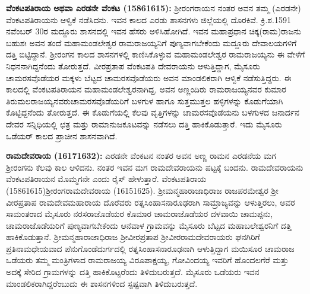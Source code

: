\textbf{ವೆಂಕಟಪತಿರಾಯ ಅಥವಾ ಎರಡನೇ ವೆಂಕಟ (1586\general{\enginline{-}}1615): } ಶ‍್ರೀರಂಗರಾಯನ ನಂತರ ಅವನ ತಮ್ಮ (ಎರಡನೇ) ವೆಂಕಟಪತಿರಾಯನು ಆಳ್ವಿಕೆ ನಡೆಸಿದನು. ಇವನ ಕಾಲದ ಎರಡು ಶಾಸನಗಳು ಜಿಲ್ಲೆಯಲ್ಲಿ ದೊರಕಿವೆ. ಕ್ರಿ.ಶ.1591 ನವೆಂಬರ್​ 30ರ ಮದ್ದೂರು ಶಾಸನದಲ್ಲಿ ಇವನ ಹೆಸರು ಅಳಿಸಿಹೋಗಿದೆ. ಇವನ ಮಹಾಪ್ರಧಾನ ಚಿಕ್ಕ(ರಾಮ)ರಾಜನು ಬಹುಶಃ ಅವನ ತಂದೆ ಮಹಾಮಂಡಲೇಶ್ವರ ರಾಮರಾಜಯ್ಯನಿಗೆ ಪುಣ್ಯವಾಗಬೇಕೆಂದು ಮದ್ದೂರು ದೇವಾಲಯಗಳಿಗೆ ದತ್ತಿ ಬಿಟ್ಟಿದ್ದಾನೆ. ಶ‍್ರೀರಂಗನ ಕಾಲದ ಶಾಸನಗಳಲ್ಲಿ ಕಾಣಿಸಿಕೊಳ್ಳುವ ಮಹಾಮಂಡಲೇಶ್ವರ ರಾಮರಾಜಯ್ಯನು ಈ ವೇಳೆಗೆ ನಿಧನನಾಗಿದ್ದನೆಂದು ತೋರುತ್ತದೆ. ವೀರಪ್ರತಾಪ ವೆಂಕಟಪತಿ ದೇವರಾಯನು ಆಳುತ್ತಿದ್ದಾಗ, ಮೈಸೂರು ಚಾಮರಸವೊಡೆಯರ ಮಕ್ಕಳು ಬೆಟ್ಟದ ಚಾಮರಸವೊಡೆಯರು ಅವನ ಮಾಂಡಲಿಕರಾಗಿ ಆಳ್ವಿಕೆ ನಡೆಸುತ್ತಿದ್ದರು. ಈ ಕಾಲದಲ್ಲಿ ವೆಂಕಟಪತಿರಾಯನ ಮಹಾಮಂಡಲೇಶ್ವರನಾಗಿದ್ದ, ಅವನ ಅಣ್ಣಂದಿರು ರಾಮರಾಜಯ್ಯನವರ ಕುಮಾರ ತಿರುಮಲರಾಜಯ್ಯನವರು\break ಚಾಮರಸವೊಡೆಯರಿಗೆ ಬಳಗುಳ ಹಾಗೂ ಸುತ್ತಮುತ್ತಲ ಹಳ್ಳಿಗಳನ್ನು ಕೊಡುಗೆಯಾಗಿ ಕೊಟ್ಟಿದ್ದನೆಂದು ತೋರುತ್ತದೆ. ಈ ಕೊಡುಗೆಯಲ್ಲಿ ಕೆಲವು ವೃತ್ತಿಗಳನ್ನು ಚಾಮರಸವೊಡೆಯನು ಬಳಗುಳದ ಜನಾರ್ದನ ದೇವರ ಸನ್ನಿಧಿಯಲ್ಲಿ ಛತ್ರ ಮತ್ತು ರಾಮಾನುಜಕೂಟವನ್ನು ನಡೆಸಲು ದತ್ತಿ ಹಾಕಿಕೊಡುತ್ತಾರೆ. ಇದು ಮೈಸೂರು ಒಡೆಯರ್ ಕಾಲದ ಪ್ರಾಚೀನ ಶಾಸನವಾಗಿದೆ.

\textbf{ರಾಮದೇವರಾಯ (1617\general{\enginline{-}}1632): } ಎರಡನೇ ವೆಂಕಟನ ನಂತರ ಅವನ ಅಣ್ಣ ರಾಮನ ಎರಡನೆಯ ಮಗ ಶ‍್ರೀರಂಗನು ಕೆಲವು ಕಾಲ ಆಳಿದನು. ನಂತರ ಇವನ ಮಗ ರಾಮದೇವರಾಯನು ಪಟ್ಟಕ್ಕೆ ಬಂದನು. ರಾಮದೇವರಾಯನು ವೆಂಕಟಪತಿರಾಯನ ಮೊಮ್ಮಗನೇ ಎಂದು ರೈಸ್​ ಹೇಳುತ್ತಾರೆ. ವೆಂಕಟಪತಿರಾಯ\enginline{-} (1586\enginline{-}1615)\enginline{-}ಶ‍್ರೀರಂಗ\enginline{-}ರಾಮದೇವರಾಯ (1615\enginline{-}1625). ಶ‍್ರೀಮನ್ಮಹಾರಾಜಾಧಿರಾಜ ರಾಜಪರಮೇಶ್ವರ ಶ‍್ರೀ ವೀರಪ್ರತಾಪ ರಾಮದೇವಮಹಾರಾಯ ದೊರೆವರು ರತ್ನಸಿಂಹಾಸನಾರೂಢರಾಗಿ ಸಾಮ್ರಾಜ್ಯವನ್ನು ಆಳುತ್ತಿರಲು, ಅವರ ಸಾಮಂತರಾದ ಮೈಸೂರು ನರಸರಾಜೊಡೆಯರ ಕೊಮಾರ ಚಾಮರಾಜೊಡೆಯರ ದಳವಾಯಿ ಚಾಮಪ್ಪನು, ಚಾಮರಾಜೊಡೆಯರಿಗೆ ಪುಣ್ಯವಾಗಬೇಕೆಂದು ಆನೆವಾಳ ಗ್ರಾಮ\-ವನ್ನು ಮೈಸೂರು ಬೆಟ್ಟದ ಮಹಾಬಲೇಶ್ವರನಿಗೆ ದತ್ತಿ ಹಾಕಿಕೊಡುತ್ತಾನೆ. ಶ‍್ರೀಮನ್ಮಹಾ\-ರಾಜಾಧಿರಾಜ ಶ‍್ರೀವೀರಪ್ರತಾಪ ಶ‍್ರೀವೀರರಾಮದೇವರಾಯರು ಘನಗಿರಿಗೆ ಪ್ರತಿನಾಮಧೇಯವಾದ ಪೆನುಗೊಂಡೆದುರ್ಗದಲ್ಲಿ ರತ್ನಸಿಂಹಾಸನಾರೂಢನಾಗಿ ಆಳುತ್ತಿದ್ದಾಗ ಮಯಿಸೂರ ಚಾಮರಾಜ ಒಡೆಯರು ತಮ್ಮ ಮಂತ್ರಿಗಳಾದ ರಾಮರಾಜಯ್ಯ ವಿರೂಪಾಕ್ಷಯ್ಯ, ಗೋವಿಂದಯ್ಯ ಇವರಿಗೆ ಹೊಂದಲಗೆರೆ ಮತ್ತು ಅದಕ್ಕೆ ಸೇರಿದ ಗ್ರಾಮಗಳನ್ನು ದತ್ತಿ ಹಾಕಿಕೊಟ್ಟರೆಂದು ತಿಳಿದುಬರುತ್ತದೆ. ಮೈಸೂರು ಒಡೆಯರು ಇವನ ಮಾಂಡಲಿಕರಾಗಿದ್ದರೆಂಬುದು ಈ ಶಾಸನಗಳಿಂದ ಸ್ಪಷ್ಟವಾಗಿ ತಿಳಿದುಬರುತ್ತದೆ.

